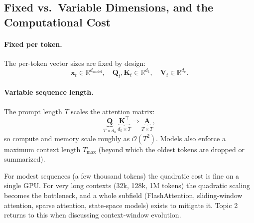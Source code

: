\documentclass[11pt]{article}
\theoremstyle{remark}
\begin{document}
\subsection{Fixed vs.\ Variable Dimensions, and the Computational Cost}

\paragraph{Fixed per token.} The per-token vector sizes are fixed by design:
\[
\mathbf{x}_t\in\mathbb{R}^{d_{\text{model}}},\quad
\mathbf{Q}_t,\mathbf{K}_t\in\mathbb{R}^{d_k},\quad
\mathbf{V}_t\in\mathbb{R}^{d_v}.
\]
\paragraph{Variable sequence length.} The prompt length \(T\) scales the attention matrix:
\[
\underbrace{\mathbf{Q}}_{T\times d_k}\ \underbrace{\mathbf{K}^\top}_{d_k\times T}
\Rightarrow \underbrace{\mathbf{A}}_{T\times T},
\]
so compute and memory scale roughly as \(\mathcal{O}(T^2)\). Models also enforce a maximum context length \(T_{\max}\) (beyond which the oldest tokens are dropped or summarized).

For modest sequences (a few thousand tokens) the quadratic cost is fine on a single GPU. For very long contexts (32k, 128k, 1M tokens) the quadratic scaling becomes the bottleneck, and a whole subfield (FlashAttention, sliding-window attention, sparse attention, state-space models) exists to mitigate it. Topic 2 returns to this when discussing context-window evolution.
\end{document}
